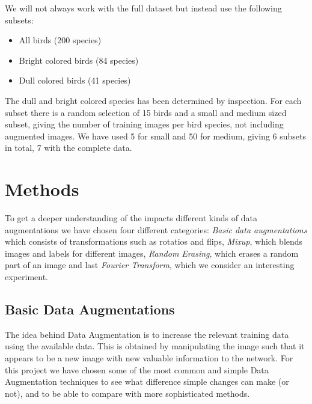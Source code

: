 \documentclass{article}
\begin{document}
We will not always work with the full dataset but instead use the following subsets:

\begin{itemize}
	\item All birds (200 species)
	\item Bright colored birds (84 species)
	\item Dull colored birds (41 species)
\end{itemize}

The dull and bright colored species has been determined by inspection. For each subset there is a random selection of 15 birds and a small and medium sized subset, giving the number of training images per bird species, not including augmented images. We have used 5 for small and 50 for medium, giving 6 subsets in total, 7 with the complete data.


\section{Methods}




To get a deeper understanding of the impacts different kinds of data augmentations 
we have chosen four different categories: \textit{Basic data augmentations} which consists of transformations such as rotatios and flips, 
\textit{Mixup}, which blends images and labels for different images, \textit{Random Erasing}, which erases a random part of an image and last 
\textit{Fourier Transform}, which we consider an interesting experiment.

\subsection{Basic Data Augmentations}
The idea behind Data Augmentation is to increase the relevant training data using the available data. This is obtained by manipulating the image such that it appears to be a new image with new valuable information to the network. For this project we have chosen some of the most common and simple Data Augmentation techniques to see what difference simple changes can make (or not), and to be able to compare with more sophisticated methods. 
\end{document}

